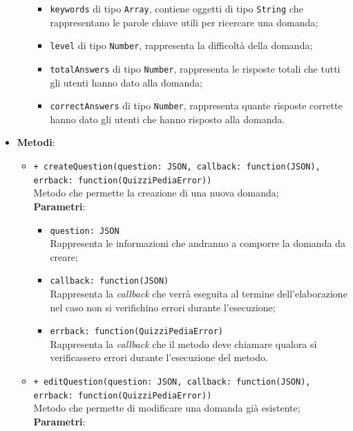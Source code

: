 \begin{itemize}
\begin{itemize}
\begin{itemize}
\begin{itemize}
				\end{itemize}			
					\item \texttt{keywords} di tipo \texttt{Array}, contiene oggetti di tipo \texttt{String} che rappresentano le parole chiave utili per ricercare una domanda;	 
			\item \texttt{level} di tipo \texttt{Number}, rappresenta la difficoltà della domanda;
			\item \texttt{totalAnswers} di tipo \texttt{Number}, rappresenta le risposte totali che tutti gli utenti hanno dato alla domanda;
			\item \texttt{correctAnswers} di tipo \texttt{Number}, rappresenta quante risposte corrette hanno dato gli utenti che hanno risposto alla domanda.
		
		\end{itemize}
	\end{itemize}
\item \textbf{Metodi}:
	\begin{itemize}
	\item \texttt{+ createQuestion(question: JSON, callback: function(JSON),\\ errback: function(QuizziPediaError))} \\
	Metodo che permette la creazione di una nuova domanda; \\
		\textbf{Parametri}:
		\begin{itemize}
			\item \texttt{question: JSON} \\
			Rappresenta le informazioni che andranno a comporre la domanda da creare;
			\item \texttt{callback: function(JSON)} \\
			Rappresenta la \textit{callback} che verrà eseguita al termine dell'elaborazione nel caso non si verifichino errori durante l'esecuzione;
			\item \texttt{errback: function(QuizziPediaError)} \\
			Rappresenta la \textit{callback} che il metodo deve chiamare qualora si verificassero errori durante l'esecuzione del metodo.
		\end{itemize}   
	\item \texttt{+ editQuestion(question: JSON, callback: function(JSON),\\ errback: function(QuizziPediaError))} \\
	Metodo che permette di modificare una domanda già esistente; \\
		\textbf{Parametri}:

\end{itemize}
\end{itemize}
